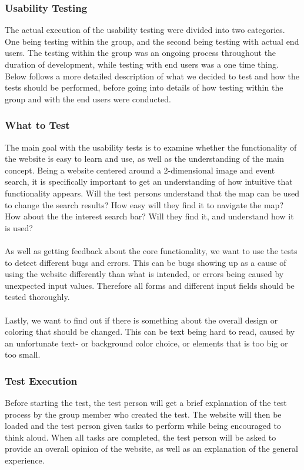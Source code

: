 \subsubsection{Usability Testing} The actual execution of the usability testing were divided into two categories. One being testing within the group, and the second being testing with actual end users. The testing within the group was an ongoing process throughout the duration of development, while testing with end users was a one time thing. Below follows a more detailed description of what we decided to test and how the tests should be performed, before going into details of how testing within the group and with the end users were conducted.

\subsubsection{What to Test} The main goal with the usability tests is to examine whether the functionality of the website is easy to learn and use, as well as the understanding of the main concept. Being a website centered around a 2-dimensional image and event search, it is specifically important to get an understanding of how intuitive that functionality appears. Will the test persons understand that the map can be used to change the search results? How easy will they find it to navigate the map? How about the the interest search bar? Will they find it, and understand how it is used?

\paragraph{} As well as getting feedback about the core functionality, we want to use the tests to detect different bugs and errors. This can be bugs showing up as a cause of using the website differently than what is intended, or errors being caused by unexpected input values. Therefore all forms and different input fields should be tested thoroughly.

\paragraph{} Lastly, we want to find out if there is something about the overall design or coloring that should be changed. This can be text being hard to read, caused by an unfortunate text- or background color choice, or elements that is too big or too small.  

\subsubsection{Test Execution} Before starting the test, the test person will get a brief explanation of the test process by the group member who created the test. The website will then be loaded and the test person given tasks to perform while being encouraged to think aloud. When all tasks are completed, the test person will be asked to provide an overall opinion of the website, as well as an explanation of the general experience.

